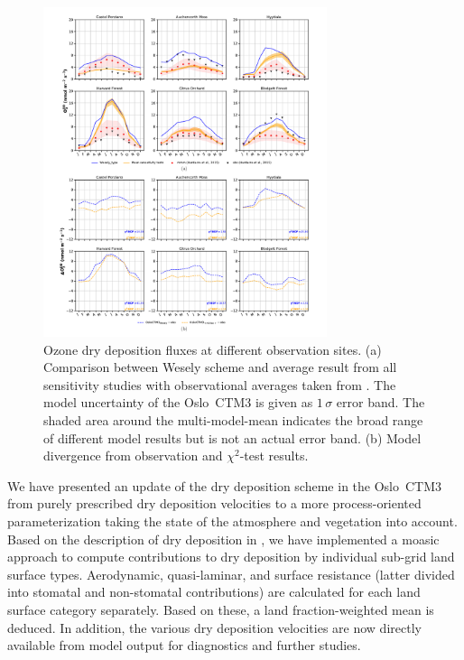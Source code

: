 \documentclass[gmd, manuscript]{copernicus}
\begin{document}
%
\begin{figure}[t]
  \includegraphics[width=8.3cm]{fig09}
  \caption{Ozone dry deposition fluxes at different observation sites. (a) Comparison between Wesely scheme and average result from all sensitivity studies with observational averages taken from \citet{ACP:Hardacre2015}. The model uncertainty of the Oslo~CTM3 is given as $1\,\sigma$ error band. The shaded area around the multi-model-mean indicates the broad range of different model results but is not an actual error band. (b) Model divergence from observation and $\chi^2$-test results.}
  \label{fig:mmm_drydep_stations}
\end{figure}

\label{sec:conc}
We have presented an update of the dry deposition scheme in the Oslo~CTM3 from purely prescribed dry deposition velocities \citep{AE:Wesely1989,JGR:Hough1991} to a more process-oriented parameterization taking the state of the atmosphere and vegetation into account. Based on the description of dry deposition in \citet{WASP:Simpson2003,ACP:Simpson2012}, we have implemented a moasic approach to compute contributions to dry deposition by individual sub-grid land surface types. Aerodynamic, quasi-laminar, and surface resistance (latter divided into stomatal and non-stomatal contributions) are calculated for each land surface category separately. Based on these, a land fraction-weighted mean is deduced. In addition, the various dry deposition velocities are now directly available from model output for diagnostics and further studies.
\end{document}
